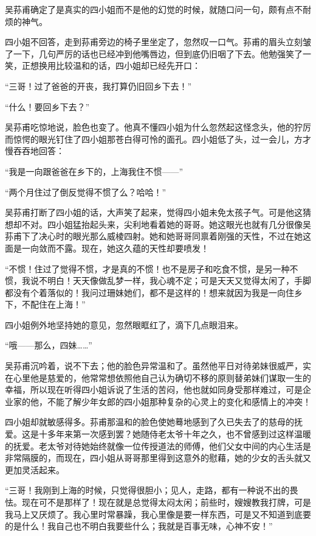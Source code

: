 \par 吴荪甫确定了是真实的四小姐而不是他的幻觉的时候，就随口问一句，颇有点不耐烦的神气。
\par 四小姐不回答，走到荪甫旁边的椅子里坐定了，忽然叹一口气。荪甫的眉头立刻皱了一下，几句严厉的话也已经冲到他嘴唇边，但到底仍旧咽了下去。他勉强笑了一笑，正想换用比较温和的话，四小姐却已经先开口：
\par “三哥！过了爸爸的开丧，我打算仍旧回乡下去！”
\par “什么！要回乡下去？”
\par 吴荪甫吃惊地说，脸色也变了。他真不懂四小姐为什么忽然起这怪念头，他的狞厉而惊愕的眼光钉住了四小姐那苍白得可怜的面孔。四小姐低了头，过一会儿，方才慢吞吞地回答：
\par “我是一向跟爸爸在乡下的，上海我住不惯——”
\par “两个月住过了倒反觉得不惯了么？哈哈！”
\par 吴荪甫打断了四小姐的话，大声笑了起来，觉得四小姐未免太孩子气。可是他这猜想却不对。四小姐猛抬起头来，尖利地看着她的哥哥。她这眼光也就有几分很像吴荪甫下了决心时的眼光那么威棱四射。她和她哥哥同禀着刚强的天性，不过在她这面是一向敛而不露。现在，她这久蕴的天性却要喷发！
\par “不惯！住过了觉得不惯，才是真的不惯！也不是房子和吃食不惯，是另一种不惯，我说不明白！天天像做乱梦一样，我心魂不定；可是天天又觉得太闲了，手脚都没有个着落似的！我问过珊妹她们，都不是这样的！想来就因为我是一向住乡下，不配住在上海！”
\par 四小姐例外地坚持她的意见，忽然眼眶红了，滴下几点眼泪来。
\par “哦——那么，四妹……”
\par 吴荪甫沉吟着，说不下去；他的脸色异常温和了。虽然他平日对待弟妹很威严，实在心里他是慈爱的，他常常想依照他自己认为确切不移的原则替弟妹们谋取一生的幸福，所以现在听得四小姐诉说了生活的苦闷，他也就如同身受那样难过，可是企业家的他，不能了解少年女郎的四小姐那种复杂的心灵上的变化和感情上的冲突！
\par 四小姐却就敏感得多。荪甫那温和的脸色使她蓦地感到了久已失去了的慈母的抚爱。这是十多年来第一次感到罢？她随侍老太爷十年之久，也不曾感到过这样温暖的抚爱。老太爷对待她始终就像一位传授道法的师傅，他们父女中间的内心生活是非常隔膜的，而现在，四小姐从哥哥那里得到这意外的慰藉，她的少女的舌头就又更加灵活起来。
\par “三哥！我刚到上海的时候，只觉得很胆小；见人，走路，都有一种说不出的畏怯。现在可不是那样了！现在就是总觉得太闷太闲；前些时，嫂嫂教我打牌，可是我马上又厌烦了。我心里时常暴躁，我心里像是要一样东西，可是又不知道到底要的是什么！我自己也不明白我要些什么；我就是百事无味，心神不安！”
